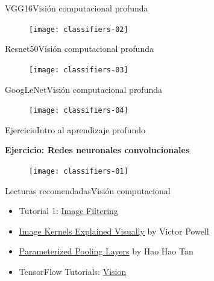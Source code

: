 \documentclass[10pt,border=3pt,tikz]{beamer}
\begin{document}
    \begin{frame}{VGG16}{Visión computacional profunda}
        \begin{figure}
            \centering
            \texttt{[image: classifiers-02]}
        \end{figure}
    \end{frame}
    
    \begin{frame}{Resnet50}{Visión computacional profunda}
        \begin{figure}
            \centering
            \texttt{[image: classifiers-03]}
        \end{figure}
    \end{frame}
    
    \begin{frame}{GoogLeNet}{Visión computacional profunda}
        \begin{figure}
            \centering
            \texttt{[image: classifiers-04]}
        \end{figure}
    \end{frame}
    
    \begin{frame}{Ejercicio}{Intro al aprendizaje profundo}
        \begin{center}
            {\Large \textbf{Ejercicio: Redes neuronales convolucionales}}
        \end{center}
        \begin{figure}
            \centering
            \texttt{[image: classifiers-01]}
        \end{figure}
    \end{frame}
    
    \begin{frame}{Lecturas recomendadas}{Visión computacional}
        \begin{itemize}
            \item Tutorial 1: \colorbox{blue!10}{\href{https://ai.stanford.edu/~syyeung/cvweb/tutorial1.html}{Image Filtering}}
            \item \colorbox{blue!10}{\href{https://setosa.io/ev/image-kernels/}{Image Kernels Explained Visually}} by Victor Powell
            \item \colorbox{blue!10}{\href{https://gudgud96.github.io/2020/11/25/param-pooling/}{Parameterized Pooling Layers}} by Hao Hao Tan
            \item TensorFlow Tutorials: \colorbox{blue!10}{\href{https://www.tensorflow.org/tutorials/images}{Vision}}
            
        \end{itemize}
    \end{frame}
    
\end{document}
